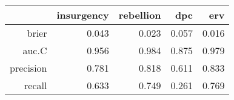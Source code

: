 \begin{tabular}{rrrrr}
  \hline
 & insurgency & rebellion & dpc & erv \\ 
  \hline
brier & 0.043 & 0.023 & 0.057 & 0.016 \\ 
  auc.C & 0.956 & 0.984 & 0.875 & 0.979 \\ 
  precision & 0.781 & 0.818 & 0.611 & 0.833 \\ 
  recall & 0.633 & 0.749 & 0.261 & 0.769 \\ 
   \hline
\end{tabular}

